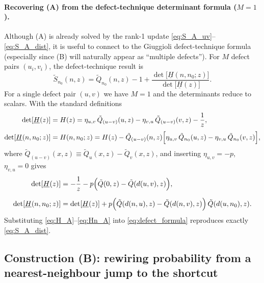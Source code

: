 \documentclass[11pt]{article}
\begin{document}
\paragraph{Recovering (A) from the defect-technique determinant formula ($M=1$).}
Although (A) is already solved by the rank-1 update \eqref{eq:S_A_uv}--\eqref{eq:S_A_dist}, it is useful to connect to the
Giuggioli defect-technique formula (especially since (B) will naturally appear as ``multiple defects'').
For $M$ defect pairs $(u_i,v_i)$, the defect-technique result is
\begin{equation}
\tilde S_{n_0}(n,z)
=
\tilde Q_{n_0}(n,z)-1+\frac{\det\!\bigl[\underline{H}(n,n_0;z)\bigr]}{\det\!\bigl[\underline{H}(z)\bigr]}.
\label{eq:defect_formula}
\end{equation}
For a single defect pair $(u,v)$ we have $M=1$ and the determinants reduce to scalars.
With the standard definitions
\begin{align}
\det[\underline{H}(z)]
&=
H(z)
=
\eta_{u,v}\,\tilde Q_{(u-v)}(u,z)-\eta_{v,u}\,\tilde Q_{(u-v)}(v,z)-\frac{1}{z},
\label{eq:H_scalar}\\[1mm]
\det[\underline{H}(n,n_0;z)]
&=
H(n,n_0;z)
=
H(z)-\tilde Q_{(u-v)}(n,z)\Bigl[\eta_{u,v}\,\tilde Q_{n_0}(u,z)-\eta_{v,u}\,\tilde Q_{n_0}(v,z)\Bigr],
\label{eq:Hn_scalar}
\end{align}
where $\tilde Q_{(u-v)}(x,z)\equiv \tilde Q_u(x,z)-\tilde Q_v(x,z)$,
and inserting $\eta_{u,v}=-p$, $\eta_{v,u}=0$ gives
\begin{align}
\det[\underline{H}(z)]
&=
-\frac{1}{z}
-p\Bigl(\tilde Q(0,z)-\tilde Q(d(u,v),z)\Bigr),
\label{eq:H_A}\\[2mm]
\det[\underline{H}(n,n_0;z)]
&=
\det[\underline{H}(z)]
+p\Bigl(\tilde Q(d(n,u),z)-\tilde Q(d(n,v),z)\Bigr)\,\tilde Q(d(u,n_0),z).
\label{eq:Hn_A}
\end{align}
Substituting \eqref{eq:H_A}--\eqref{eq:Hn_A} into \eqref{eq:defect_formula} reproduces exactly \eqref{eq:S_A_dist}.

\subsection{Construction (B): rewiring probability from a nearest-neighbour jump to the shortcut}
\end{document}
